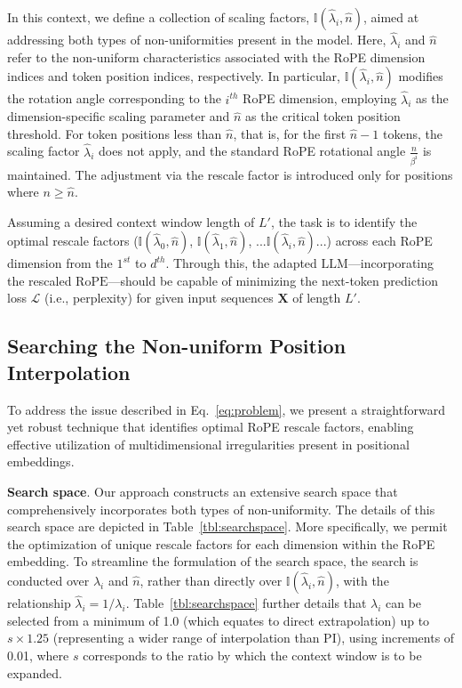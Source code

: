 In this context, we define a collection of scaling factors, $\mathbb{I}(\hat{\lambda}_{i},\hat{n})$, aimed at addressing both types of non-uniformities present in the model. Here, $\hat{\lambda}_{i}$ and $\hat{n}$ refer to the non-uniform characteristics associated with the RoPE dimension indices and token position indices, respectively. In particular, $\mathbb{I}(\hat{\lambda}_{i},\hat{n})$ modifies the rotation angle corresponding to the $i^{th}$ RoPE dimension, employing $\hat\lambda_{i}$ as the dimension-specific scaling parameter and $\hat{n}$ as the critical token position threshold. For token positions less than $\hat{n}$, that is, for the first $\hat{n}-1$ tokens, the scaling factor $\hat\lambda_{i}$ does not apply, and the standard RoPE rotational angle $\frac{n}{\beta^i}$ is maintained. The adjustment via the rescale factor is introduced only for positions where $n\ge\hat{n}$.

Assuming a desired context window length of $L'$, the task is to identify the optimal rescale factors ($\mathbb{I}(\hat{\lambda}_{0},\hat{n})$, $\mathbb{I}(\hat{\lambda}_{1},\hat{n})$, ...$\mathbb{I}(\hat{\lambda}_{i},\hat{n})$...) across each RoPE dimension from the $1^{st}$ to $d^{th}$. Through this, the adapted $\text{LLM}$—incorporating the rescaled $\text{RoPE}$—should be capable of minimizing the next-token prediction loss $\mathcal{L}$ (i.e., perplexity) for given input sequences $\mathbf{X}$ of length $L'$.

\subsection{Searching the Non-uniform Position Interpolation}

To address the issue described in Eq.~\ref{eq:problem}, we present a straightforward yet robust technique that identifies optimal RoPE rescale factors, enabling effective utilization of multidimensional irregularities present in positional embeddings.

\textbf{Search space}. Our approach constructs an extensive search space that comprehensively incorporates both types of non-uniformity. The details of this search space are depicted in Table~\ref{tbl:searchspace}. More specifically, we permit the optimization of unique rescale factors for each dimension within the RoPE embedding. To streamline the formulation of the search space, the search is conducted over $\lambda_i$ and $\hat{n}$, rather than directly over $\mathbb{I}(\hat{\lambda}_{i},\hat{n})$, with the relationship $\hat{\lambda}_{i}=1/\lambda_i$. Table~\ref{tbl:searchspace} further details that $\lambda_i$ can be selected from a minimum of 1.0 (which equates to direct extrapolation) up to $s\times1.25$ (representing a wider range of interpolation than PI), using increments of 0.01, where $s$ corresponds to the ratio by which the context window is to be expanded.

